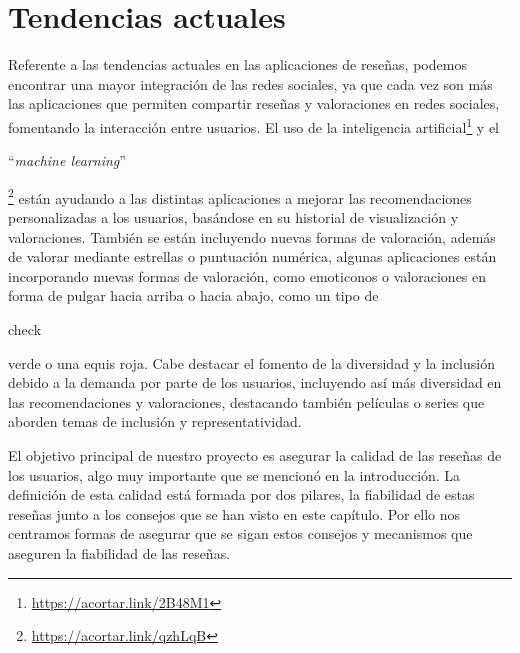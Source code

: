 \section{Tendencias actuales}

Referente a las tendencias actuales en las aplicaciones de reseñas, podemos encontrar una mayor integración de las redes sociales, ya que cada vez son más las aplicaciones que permiten compartir reseñas y valoraciones en redes sociales, fomentando la interacción entre usuarios. El uso de la inteligencia artificial\footnote{\url{https://acortar.link/2B48M1}} y el \begin{otherlanguage}{english}``\textit{machine learning}''\end{otherlanguage} \cite{MachLear} \footnote{\url{https://acortar.link/qzhLqB}} están ayudando a las distintas aplicaciones a mejorar las recomendaciones personalizadas a los usuarios, basándose en su historial de visualización y valoraciones. También se están incluyendo nuevas formas de valoración, además de valorar mediante estrellas o puntuación numérica, algunas aplicaciones están incorporando nuevas formas de valoración, como emoticonos o valoraciones en forma de pulgar hacia arriba o hacia abajo, como un tipo de \begin{otherlanguage}{english}check \end{otherlanguage} verde o una equis roja. Cabe destacar el fomento de la diversidad y la inclusión debido a la demanda por parte de los usuarios, incluyendo así más diversidad en las recomendaciones y valoraciones, destacando también películas o series que aborden temas de inclusión y representatividad.

El objetivo principal de nuestro proyecto es asegurar la calidad de las reseñas de los usuarios, algo muy importante que se mencionó en la introducción. La definición de esta calidad está formada por dos pilares, la fiabilidad de estas reseñas junto a los consejos que se han visto en este capítulo. Por ello nos centramos formas de asegurar que se sigan estos consejos y mecanismos que aseguren la fiabilidad de las reseñas.  




